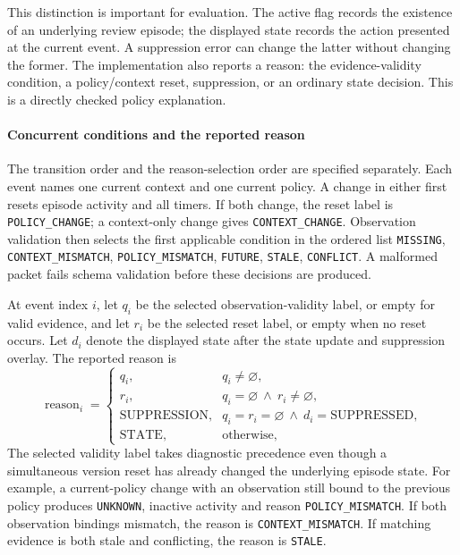 \documentclass[preprint,11pt]{elsarticle}
\newcommand{\code}[1]{\texttt{#1}}
\begin{document}
This distinction is important for evaluation. The active flag records the existence of an underlying review episode; the displayed state records the action presented at the current event. A suppression error can change the latter without changing the former. The implementation also reports a reason: the evidence-validity condition, a policy/context reset, suppression, or an ordinary state decision. This is a directly checked policy explanation.

\paragraph{Concurrent conditions and the reported reason}
The transition order and the reason-selection order are specified separately. Each event names one current context and one current policy. A change in either first resets episode activity and all timers. If both change, the reset label is \code{POLICY\_CHANGE}; a context-only change gives \code{CONTEXT\_CHANGE}. Observation validation then selects the first applicable condition in the ordered list \code{MISSING}, \code{CONTEXT\_MISMATCH}, \code{POLICY\_MISMATCH}, \code{FUTURE}, \code{STALE}, \code{CONFLICT}. A malformed packet fails schema validation before these decisions are produced.

At event index $i$, let $q_i$ be the selected observation-validity label, or empty for valid evidence, and let $r_i$ be the selected reset label, or empty when no reset occurs. Let $d_i$ denote the displayed state after the state update and suppression overlay. The reported reason is
\begin{equation}
\operatorname{reason}_i=
\begin{cases}
q_i, & q_i\ne\varnothing,\\
r_i, & q_i=\varnothing\ \land\ r_i\ne\varnothing,\\
\text{SUPPRESSION}, & q_i=r_i=\varnothing\ \land\ d_i=\text{SUPPRESSED},\\
\text{STATE}, & \text{otherwise},
\end{cases}
\end{equation}
The selected validity label takes diagnostic precedence even though a simultaneous version reset has already changed the underlying episode state. For example, a current-policy change with an observation still bound to the previous policy produces \code{UNKNOWN}, inactive activity and reason \code{POLICY\_MISMATCH}. If both observation bindings mismatch, the reason is \code{CONTEXT\_MISMATCH}. If matching evidence is both stale and conflicting, the reason is \code{STALE}.
\end{document}
